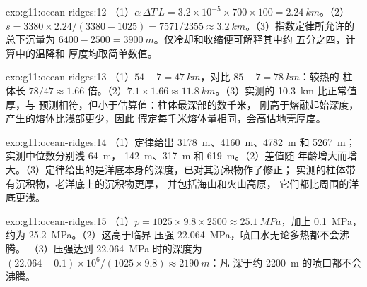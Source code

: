 \begin{solution}{exo:g11:ocean-ridges:12}
（1）$\alpha\,\Delta T\,L = 3.2 \times 10^{-5} \times 700 \times 100 =
\qty{2.24}{km}$。（2）$s = 3380 \times 2.24/(3380 - 1025) = 7571/2355 \approx
\qty{3.2}{km}$。（3）指数定律所允许的总下沉量为 $6400 - 2500 =
\qty{3900}{m}$。仅冷却和收缩便可解释其中约
五分之四，计算中的温降和
厚度均取简单数值。
\end{solution}

\begin{solution}{exo:g11:ocean-ridges:13}
（1）$54 - 7 = \qty{47}{km}$，对比 $85 - 7 = \qty{78}{km}$：较热的
柱体长 $78/47 \approx 1.66$ 倍。（2）$7.1 \times 1.66 \approx
\qty{11.8}{km}$。（3）实测的 \qty{10.3}{km} 比正常值厚，与
预测相符，但小于估算值：柱体最深部的数千米，
刚高于熔融起始深度，产生的熔体比浅部更少，因此
假定每千米熔体量相同，会高估地壳厚度。
\end{solution}

\begin{solution}{exo:g11:ocean-ridges:14}
（1）定律给出 \qty{3178}{m}、\qty{4160}{m}、\qty{4782}{m} 和
\qty{5267}{m}；实测中位数分别浅 \qty{64}{m}，
\qty{142}{m}、\qty{317}{m} 和 \qty{619}{m}。（2）差值随
年龄增大而增大。（3）定律给出的是洋底本身的深度，已对其沉积物作了修正；
实测的柱体带有沉积物，老洋底上的沉积物更厚，
并包括海山和火山高原，
它们都比周围的洋底更浅。
\end{solution}

\begin{solution}{exo:g11:ocean-ridges:15}
（1）$p = 1025 \times 9.8 \times 2500 \approx \qty{25.1}{MPa}$，加上
\qty{0.1}{MPa}，约为 \qty{25.2}{MPa}。（2）这高于临界
压强 \qty{22.064}{MPa}，喷口水无论多热都不会沸腾。
（3）压强达到 \qty{22.064}{MPa} 时的深度为
$(22.064 - 0.1) \times 10^6/(1025 \times 9.8) \approx \qty{2190}{m}$：凡
深于约 \qty{2200}{m} 的喷口都不会沸腾。
\end{solution}

